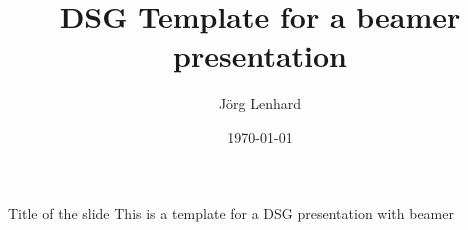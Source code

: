 \documentclass{beamer}
\title[DSG Template]{DSG Template for a beamer presentation}
\author{J\"org Lenhard}
\institute{Distributed Systems Group - WIAI - University of Bamberg}
\date{\today}
\begin{document}
 \begin{frame}[plain]
	\titlepage
\end{frame}

\begin{frame}{Title of the slide}
This is a template for a DSG presentation with beamer
\end{frame}
\end{document}
